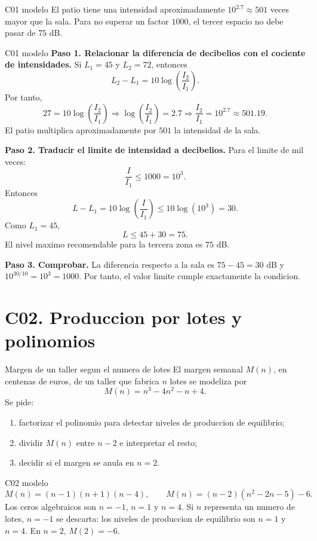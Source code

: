 \begin{shortanswer}{C01 modelo}
El patio tiene una intensidad aproximadamente \(10^{2.7}\approx 501\) veces mayor que la sala.
Para no superar un factor \(1000\), el tercer espacio no debe pasar de \(75\) dB.
\end{shortanswer}

\begin{fullsolution}{C01 modelo}
\textbf{Paso 1. Relacionar la diferencia de decibelios con el cociente de intensidades.}
Si \(L_1=45\) y \(L_2=72\), entonces
\[
L_2-L_1=10\log\left(\frac{I_2}{I_1}\right).
\]
Por tanto,
\[
27=10\log\left(\frac{I_2}{I_1}\right)
\Longrightarrow
\log\left(\frac{I_2}{I_1}\right)=2.7
\Longrightarrow
\frac{I_2}{I_1}=10^{2.7}\approx 501.19.
\]
El patio multiplica aproximadamente por \(501\) la intensidad de la sala.

\textbf{Paso 2. Traducir el limite de intensidad a decibelios.}
Para el limite de mil veces:
\[
\frac{I}{I_1}\leq 1000=10^3.
\]
Entonces
\[
L-L_1=10\log\left(\frac{I}{I_1}\right)\leq 10\log(10^3)=30.
\]
Como \(L_1=45\),
\[
L\leq 45+30=75.
\]
El nivel maximo recomendable para la tercera zona es \(75\) dB.

\textbf{Paso 3. Comprobar.} La diferencia respecto a la sala es \(75-45=30\) dB y
\(10^{30/10}=10^3=1000\). Por tanto, el valor limite cumple exactamente la condicion.
\end{fullsolution}

\section{C02. Produccion por lotes y polinomios}

\begin{contextproblem}{Margen de un taller segun el numero de lotes}
El margen semanal \(M(n)\), en centenas de euros, de un taller que fabrica \(n\) lotes se
modeliza por
\[
M(n)=n^3-4n^2-n+4.
\]
Se pide:
\begin{enumerate}
  \item factorizar el polinomio para detectar niveles de produccion de equilibrio;
  \item dividir \(M(n)\) entre \(n-2\) e interpretar el resto;
  \item decidir si el margen se anula en \(n=2\).
\end{enumerate}
\end{contextproblem}

\begin{shortanswer}{C02 modelo}
\[
M(n)=(n-1)(n+1)(n-4),\qquad
M(n)=(n-2)(n^2-2n-5)-6.
\]
Los ceros algebraicos son \(n=-1\), \(n=1\) y \(n=4\). Si \(n\) representa un numero de lotes,
\(n=-1\) se descarta: los niveles de produccion de equilibrio son \(n=1\) y \(n=4\). En
\(n=2\), \(M(2)=-6\).
\end{shortanswer}

